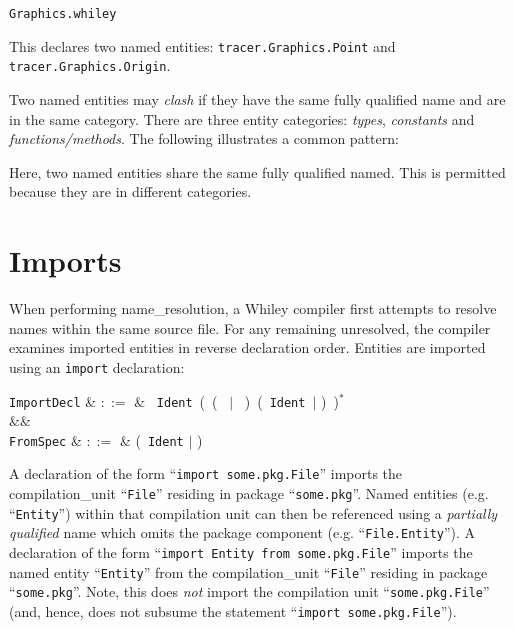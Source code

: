 \noindent \verb+Graphics.whiley+



This declares two named entities: \lstinline{tracer.Graphics.Point} and \lstinline{tracer.Graphics.Origin}.  

Two named entities may {\em clash} if they have the same fully qualified name and are in the same category.  There are three entity categories: {\em types}, {\em constants} and {\em functions/methods}.  The following illustrates a common pattern:



Here, two named entities share the same fully qualified named.  This is permitted because they are in different categories.


\section{Imports}

When performing \gls{name_resolution}, a Whiley compiler first attempts to resolve names within the same source file.  For any remaining unresolved, the compiler examines imported entities in reverse declaration order.  Entities are imported using an \lstinline{import} declaration:

\begin{syntax}
\verb+ImportDecl+ & $::=$ &  \ \verb+Ident+\ \Big(\ \big(\  $|$ \ \big)\ \big(\ \verb+Ident+\ $|$ \token{*}\big)\ \Big)$^*$\\
&&\\
\verb+FromSpec+ & $::=$ & \big(\ \verb+Ident+ $|$ \token{*} \big) \\
\end{syntax}

A declaration of the form ``\lstinline{import some.pkg.File}'' imports the \gls{compilation_unit} ``\lstinline{File}'' residing in package ``\lstinline{some.pkg}''.  Named entities (e.g. ``\lstinline{Entity}'') within that compilation unit can then be referenced using a {\em partially qualified} name which omits the package component (e.g. ``\lstinline{File.Entity}'').  A declaration of the form ``\lstinline{import Entity from some.pkg.File}'' imports the named entity ``\lstinline{Entity}'' from the \gls{compilation_unit} ``\lstinline{File}'' residing in package ``\lstinline{some.pkg}''.  Note, this does {\em not} import the compilation unit ``\lstinline{some.pkg.File}'' (and, hence, does not subsume the statement ``\lstinline{import some.pkg.File}'').

